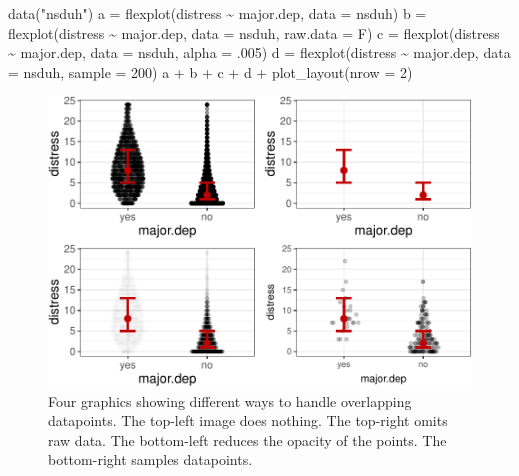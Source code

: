 \documentclass[
  english,
  man]{apa6}
\newenvironment{Shaded}{\begin{snugshade}}{\end{snugshade}}
\newcommand{\AttributeTok}[1]{\textcolor[rgb]{0.77,0.63,0.00}{#1}}
\newcommand{\DecValTok}[1]{\textcolor[rgb]{0.00,0.00,0.81}{#1}}
\newcommand{\FunctionTok}[1]{\textcolor[rgb]{0.00,0.00,0.00}{#1}}
\newcommand{\NormalTok}[1]{#1}
\newcommand{\OtherTok}[1]{\textcolor[rgb]{0.56,0.35,0.01}{#1}}
\newcommand{\SpecialCharTok}[1]{\textcolor[rgb]{0.00,0.00,0.00}{#1}}
\newcommand{\StringTok}[1]{\textcolor[rgb]{0.31,0.60,0.02}{#1}}
\begin{document}
\small

\begin{Shaded}
\begin{Highlighting}[]
\FunctionTok{data}\NormalTok{(}\StringTok{"nsduh"}\NormalTok{)}
\NormalTok{a }\OtherTok{=} \FunctionTok{flexplot}\NormalTok{(distress }\SpecialCharTok{\textasciitilde{}}\NormalTok{ major.dep, }\AttributeTok{data =}\NormalTok{ nsduh)}
\NormalTok{b }\OtherTok{=} \FunctionTok{flexplot}\NormalTok{(distress }\SpecialCharTok{\textasciitilde{}}\NormalTok{ major.dep, }\AttributeTok{data =}\NormalTok{ nsduh, }\AttributeTok{raw.data =}\NormalTok{ F)}
\NormalTok{c }\OtherTok{=} \FunctionTok{flexplot}\NormalTok{(distress }\SpecialCharTok{\textasciitilde{}}\NormalTok{ major.dep, }\AttributeTok{data =}\NormalTok{ nsduh, }\AttributeTok{alpha =}\NormalTok{ .}\DecValTok{005}\NormalTok{)}
\NormalTok{d }\OtherTok{=} \FunctionTok{flexplot}\NormalTok{(distress }\SpecialCharTok{\textasciitilde{}}\NormalTok{ major.dep, }\AttributeTok{data =}\NormalTok{ nsduh, }\AttributeTok{sample =} \DecValTok{200}\NormalTok{)}
\NormalTok{a }\SpecialCharTok{+}\NormalTok{ b }\SpecialCharTok{+}\NormalTok{ c }\SpecialCharTok{+}\NormalTok{ d }\SpecialCharTok{+} \FunctionTok{plot\_layout}\NormalTok{(}\AttributeTok{nrow =} \DecValTok{2}\NormalTok{)}
\end{Highlighting}
\end{Shaded}

\begin{figure}
\centering
\includegraphics{flexplot_psychmeth_files/figure-latex/sample-1.pdf}
\caption{\label{fig:sample}Four graphics showing different ways to handle overlapping datapoints. The top-left image does nothing. The top-right omits raw data. The bottom-left reduces the opacity of the points. The bottom-right samples datapoints. \label{fig:sample}}
\end{figure}
\end{document}
